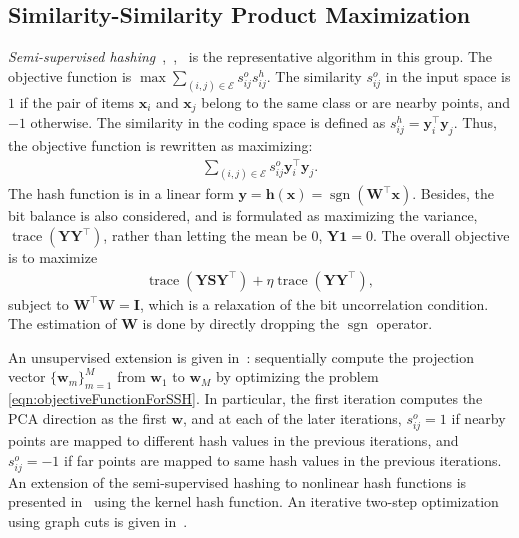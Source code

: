 \documentclass[10pt,journal,compsoc]{IEEEtran}
\begin{document}
\subsection{Similarity-Similarity Product Maximization}
\emph{Semi-supervised hashing}~\cite{WangKC10a},~\cite{WangKC10b},~\cite{WangKC12}
is the representative algorithm
in this group.
The objective function is $\operatorname{max} \sum_{(i,j)\in \mathcal{E}}s_{ij}^os_{ij}^h$.
The similarity $s_{ij}^o$ in the input space
is $1$
if the pair of items $\mathbf{x}_i$ and $\mathbf{x}_j$ belong to the same class or
are nearby points,
and $-1$ otherwise.
The similarity in the coding space is defined as
$s_{ij}^h = \mathbf{y}_i^\top\mathbf{y}_j$.
Thus, the objective function is rewritten as maximizing:
\begin{align}
\sum\nolimits_{(i,j) \in \mathcal{E}}s^o_{ij} \mathbf{y}_i^\top\mathbf{y}_j.
\end{align}
The hash function is in a linear form
$\mathbf{y} = \mathbf{h}(\mathbf{x}) = \operatorname{sgn}(\mathbf{W}^\top\mathbf{x})$.
Besides,
the bit balance is also considered,
and is formulated
as maximizing the variance, $\operatorname{trace}(\mathbf{Y}\mathbf{Y}^\top)$,
rather than letting the mean be $0$,
$\mathbf{Y}\mathbf{1} = 0$.
The overall objective is to maximize
\begin{align}
\operatorname{trace}(\mathbf{Y}\mathbf{S}\mathbf{Y}^\top) + \eta \operatorname{trace}(\mathbf{Y}\mathbf{Y}^\top),
\label{eqn:objectiveFunctionForSSH}
\end{align}
subject to
$\mathbf{W}^\top\mathbf{W} = \mathbf{I}$,
which is a relaxation of the bit uncorrelation condition.
The estimation of $\mathbf{W}$ is done
by directly dropping the $\operatorname{sgn}$ operator.

An unsupervised extension is given in~\cite{WangKC12}:
sequentially compute the projection vector $\{\mathbf{w}_m\}_{m=1}^M$
from $\mathbf{w}_1$ to $\mathbf{w}_M$
by optimizing the problem \ref{eqn:objectiveFunctionForSSH}.
In particular,
the first iteration computes the PCA direction as the first $\mathbf{w}$,
and at each of the later iterations,
$s_{ij}^o=1$ if nearby points are mapped to different hash values in the previous iterations,
and $s_{ij}^o=-1$ if far points are mapped to same hash values in the previous iterations.
An extension of the semi-supervised hashing to nonlinear hash functions
is presented in~\cite{WuZCCB13}
using the kernel hash function.
An iterative two-step optimization using graph cuts is given in~\cite{GeH014}.
\end{document}
